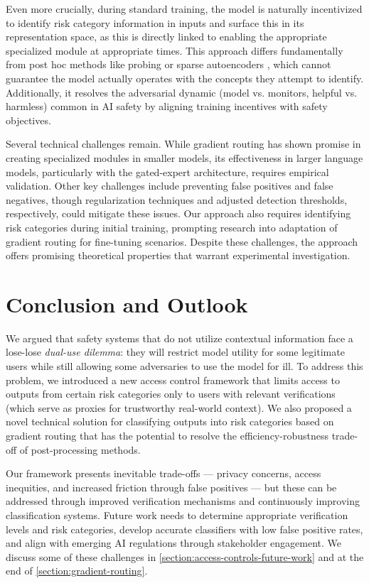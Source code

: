 \documentclass{article}
\theoremstyle{plain}
\theoremstyle{definition}
\theoremstyle{remark}
\begin{document}
Even more crucially, during standard training, the model is naturally
incentivized to identify risk category information in inputs and
surface this in its representation space, as this is directly linked
to enabling the appropriate specialized module at appropriate times.
This approach differs fundamentally from post hoc methods like
probing or sparse autoencoders
\cite{cunningham2023sparseautoencodershighlyinterpretable}, which
cannot guarantee the model actually operates with the concepts they
attempt to identify.
Additionally, it resolves the adversarial dynamic (model vs.
monitors, helpful vs. harmless) common in AI safety by aligning
training incentives with safety objectives.

Several technical challenges remain. While gradient routing has shown
promise in creating specialized modules in smaller models, its
effectiveness in larger language models, particularly with the
gated-expert architecture, requires empirical validation. Other key
challenges include preventing false positives and false negatives,
though regularization techniques and adjusted detection thresholds,
respectively, could mitigate these issues. Our approach also requires
identifying risk categories during initial training, prompting
research into adaptation of gradient routing for fine-tuning
scenarios. Despite these challenges, the approach offers promising
theoretical properties that warrant experimental investigation.

\section{Conclusion and Outlook}

We argued that safety systems that do not utilize contextual
information face a lose-lose \emph{dual-use dilemma}: they will
restrict model utility for some legitimate users while still allowing
some adversaries to use the model for ill. To address this problem,
we introduced a new access control framework that limits access to
outputs from certain risk categories only to users with relevant
verifications (which serve as proxies for trustworthy real-world
context). We also proposed a novel technical solution for classifying
outputs into risk categories based on gradient routing that has the
potential to resolve the efficiency-robustness trade-off of
post-processing methods.

Our framework presents inevitable trade-offs --- privacy concerns,
access inequities, and increased friction through false positives ---
but these can be addressed through improved verification mechanisms
and continuously improving classification systems. Future work needs
to determine appropriate verification levels and risk categories,
develop accurate classifiers with low false positive rates, and align
with emerging AI regulations through stakeholder engagement. We
discuss some of these challenges in
\cref{section:access-controls-future-work} and at the end of
\cref{section:gradient-routing}.
\end{document}
